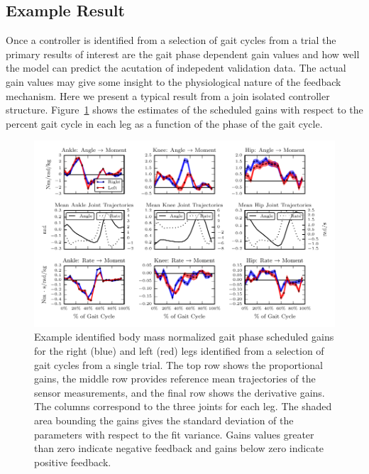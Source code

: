 \documentclass{article}
\begin{document}
\subsection*{Example Result}
%
Once a controller is identified from a selection of gait cycles from a trial
the primary results of interest are the gait phase dependent gain values and
how well the model can predict the acutation of indepedent validation data. The
actual gain values may give some insight to the physiological nature of the
feedback mechanism. Here we present a typical result from a join isolated
controller structure. Figure~\ref{fig:example-gains} shows the estimates of the
scheduled gains with respect to the percent gait cycle in each leg as a
function of the phase of the gait cycle.
%
\begin{figure}
  \centering
  \includegraphics{figures/example-identified-joint-isolated-gains.pdf}
  \caption{Example identified body mass normalized gait phase scheduled gains
    for the right (blue) and left (red) legs identified from a selection of
    gait cycles from a single trial. The top row shows the proportional gains,
    the middle row provides reference mean trajectories of the sensor
    measurements, and the final row shows the derivative gains. The columns
    correspond to the three joints for each leg. The shaded area bounding the
    gains gives the standard deviation of the parameters with respect to the
    fit variance. Gains values greater than zero indicate negative feedback and
    gains below zero indicate positive feedback.}
  \label{fig:example-gains}
\end{figure}

\end{document}
